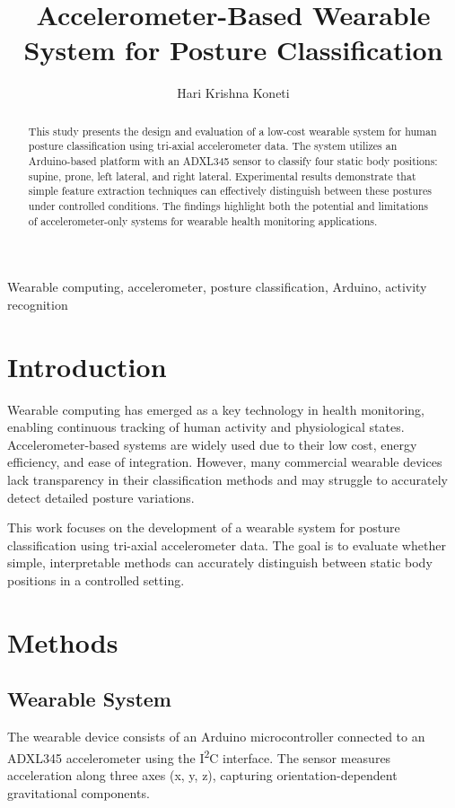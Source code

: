 \documentclass[journal]{IEEEtran}
\title{Accelerometer-Based Wearable System for Posture Classification}
\author{
Hari Krishna Koneti
}
\begin{document}
\maketitle

\begin{abstract}
This study presents the design and evaluation of a low-cost wearable system for human posture classification using tri-axial accelerometer data. The system utilizes an Arduino-based platform with an ADXL345 sensor to classify four static body positions: supine, prone, left lateral, and right lateral. Experimental results demonstrate that simple feature extraction techniques can effectively distinguish between these postures under controlled conditions. The findings highlight both the potential and limitations of accelerometer-only systems for wearable health monitoring applications.
\end{abstract}

\begin{IEEEkeywords}
Wearable computing, accelerometer, posture classification, Arduino, activity recognition
\end{IEEEkeywords}

\section{Introduction}

Wearable computing has emerged as a key technology in health monitoring, enabling continuous tracking of human activity and physiological states. Accelerometer-based systems are widely used due to their low cost, energy efficiency, and ease of integration. However, many commercial wearable devices lack transparency in their classification methods and may struggle to accurately detect detailed posture variations.

This work focuses on the development of a wearable system for posture classification using tri-axial accelerometer data. The goal is to evaluate whether simple, interpretable methods can accurately distinguish between static body positions in a controlled setting.

\section{Methods}

\subsection{Wearable System}
The wearable device consists of an Arduino microcontroller connected to an ADXL345 accelerometer using the I\textsuperscript{2}C interface. The sensor measures acceleration along three axes (x, y, z), capturing orientation-dependent gravitational components.
\end{document}
